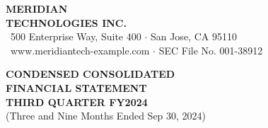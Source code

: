 \documentclass[10pt,a4paper]{article}
\begin{document}

\begin{tcolorbox}[
  enhanced,
  colback=BrandNavy,
  colframe=BrandNavy,
  arc=2.5mm,
  left=12pt, right=12pt, top=7pt, bottom=7pt
]
  \begin{minipage}[c]{0.62\textwidth}
    {\color{white}\huge\bfseries MERIDIAN} \\[1pt]
    {\color{BrandTeal}\Large\bfseries TECHNOLOGIES INC.} \\[3pt]
    {\color{white}\small\faBuilding\ 500 Enterprise Way, Suite 400 $\cdot$ San Jose, CA 95110} \\
    {\color{white}\small\faGlobe\ www.meridiantech-example.com $\cdot$ SEC File No. 001-38912}
  \end{minipage}%
  \begin{minipage}[c]{0.38\textwidth}
    \raggedleft
    \begin{tcolorbox}[
      colback=white,
      colframe=BrandTeal,
      arc=1.5mm,
      halign=center,
      top=4pt, bottom=4pt, left=4pt, right=4pt
    ]
      {\color{BrandNavy}\bfseries\small CONDENSED CONSOLIDATED}\\[1pt]
      {\color{BrandNavy}\bfseries\large FINANCIAL STATEMENT}\\[2pt]
      {\color{DarkCharcoal}\footnotesize\bfseries THIRD QUARTER FY2024}\\[1pt]
      {\color{DarkCharcoal}\tiny (Three and Nine Months Ended Sep 30, 2024)}
    \end{tcolorbox}
  \end{minipage}
\end{tcolorbox}

\vspace{-2pt}
\end{document}
